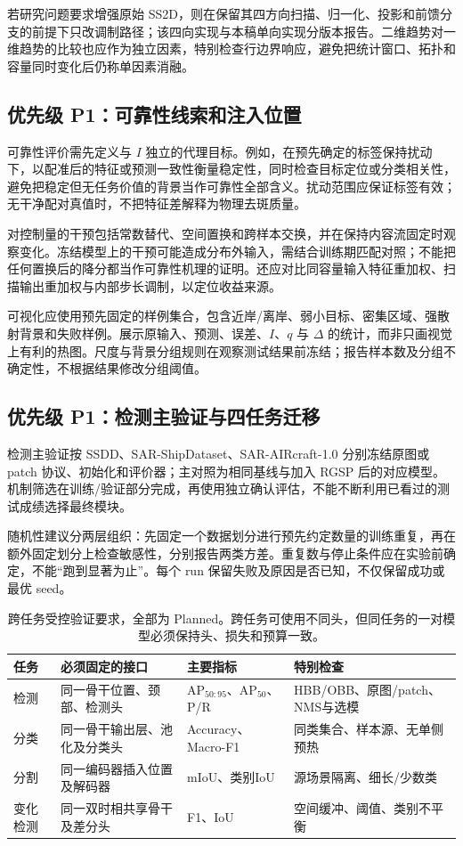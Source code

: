 \documentclass[UTF8,11pt,a4paper,fontset=fandol]{ctexart}
\newcommand{\ap}{\mathrm{AP}}
\begin{document}
若研究问题要求增强原始 SS2D，则在保留其四方向扫描、归一化、投影和前馈分支的前提下只改调制路径；该四向实现与本稿单向实现分版本报告。二维趋势对一维趋势的比较也应作为独立因素，特别检查行边界响应，避免把统计窗口、拓扑和容量同时变化后仍称单因素消融。

\subsection{优先级 P1：可靠性线索和注入位置}
可靠性评价需先定义与 $I$ 独立的代理目标。例如，在预先确定的标签保持扰动下，以配准后的特征或预测一致性衡量稳定性，同时检查目标定位或分类相关性，避免把稳定但无任务价值的背景当作可靠性全部含义。扰动范围应保证标签有效；无干净配对真值时，不把特征差解释为物理去斑质量。

对控制量的干预包括常数替代、空间置换和跨样本交换，并在保持内容流固定时观察变化。冻结模型上的干预可能造成分布外输入，需结合训练期匹配对照；不能把任何置换后的降分都当作可靠性机理的证明。还应对比同容量输入特征重加权、扫描输出重加权与内部步长调制，以定位收益来源。

可视化应使用预先固定的样例集合，包含近岸/离岸、弱小目标、密集区域、强散射背景和失败样例。展示原输入、预测、误差、$I$、$q$ 与 $\Delta$ 的统计，而非只画视觉上有利的热图。尺度与背景分组规则在观察测试结果前冻结；报告样本数及分组不确定性，不根据结果修改分组阈值。

\subsection{优先级 P1：检测主验证与四任务迁移}
检测主验证按 SSDD、SAR-ShipDataset、SAR-AIRcraft-1.0 分别冻结原图或 patch 协议、初始化和评价器；主对照为相同基线与加入 RGSP 后的对应模型。机制筛选在训练/验证部分完成，再使用独立确认评估，不能不断利用已看过的测试成绩选择最终模块。

随机性建议分两层组织：先固定一个数据划分进行预先约定数量的训练重复，再在额外固定划分上检查敏感性，分别报告两类方差。重复数与停止条件应在实验前确定，不能“跑到显著为止”。每个 run 保留失败及原因是否已知，不仅保留成功或最优 seed。

\begin{table}[H]\centering\small
\caption{跨任务受控验证要求，全部为 Planned。跨任务可使用不同头，但同任务的一对模型必须保持头、损失和预算一致。}
\begin{tabularx}{\linewidth}{P{2.1cm}P{3.7cm}YY}
\toprule
任务 & 必须固定的接口 & 主要指标 & 特别检查\\
\midrule
检测 & 同一骨干位置、颈部、检测头 & $\ap_{50:95}$、$\ap_{50}$、P/R & HBB/OBB、原图/patch、NMS与选模\\
分类 & 同一骨干输出层、池化及分类头 & Accuracy、Macro-F1 & 同类集合、样本源、无单侧预热\\
分割 & 同一编码器插入位置及解码器 & mIoU、类别IoU & 源场景隔离、细长/少数类\\
变化检测 & 同一双时相共享骨干及差分头 & F1、IoU & 空间缓冲、阈值、类别不平衡\\
\bottomrule
\end{tabularx}
\end{table}
\end{document}
